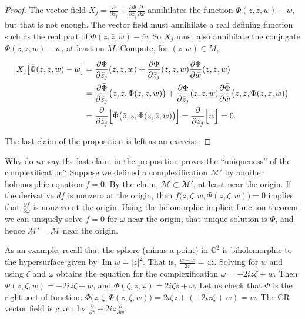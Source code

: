 \documentclass[12pt,openany]{book}
\renewcommand{\Im}{\operatorname{Im}}
\newcommand{\sabs}[1]{\lvert {#1} \rvert}
\newcommand{\C}{{\mathbb{C}}}
\newcommand{\sM}{{\mathscr{M}}}
\theoremstyle{plain}
\theoremstyle{remark}
\theoremstyle{definition}
\theoremstyle{exercise}
\theoremstyle{example}
\begin{document}
\begin{proof}
The vector field
$X_j = \frac{\partial}{\partial \bar{z}_j}
+\frac{\partial \Phi}{\partial \bar{z}_j} \frac{\partial}{\partial \omega}$
annihilates
the function $\Phi(z,\bar{z},w)-\bar{w}$, but that is not enough.
The vector field must annihilate a real defining function such as the
real part of $\Phi(z,\bar{z},w)-\bar{w}$.  So $X_j$ must also
annihilate the conjugate
$\bar{\Phi}(\bar{z},z,\bar{w})-w$, at least on $M$.  Compute, for $(z,w) \in M$,
\begin{equation*}
\begin{split}
X_j \bigl[\bar{\Phi}(\bar{z},z,\bar{w})-w\bigr]
&=
\frac{\partial \bar{\Phi}}{\partial \bar{z}_j}
{(\bar{z},z,\bar{w})}
+
\frac{\partial \Phi}{\partial \bar{z}_j}
{(z,\bar{z},w)}
\frac{\partial \bar{\Phi}}{\partial \bar{w}}
{(\bar{z},z,\bar{w})}
\\
& =
\frac{\partial \bar{\Phi}}{\partial \bar{z}_j}
{\bigl(\bar{z},z,\Phi(z,\bar{z},\bar{w})\bigr)}
+
\frac{\partial \Phi}{\partial \bar{z}_j}
{(z,\bar{z},w)}
\frac{\partial \bar{\Phi}}{\partial \bar{w}}
{\bigl(\bar{z},z,\Phi(z,\bar{z},\bar{w})\bigr)}
\\
& = 
\frac{\partial}{\partial \bar{z}_j}
\Bigl[
\bar{\Phi}\bigl(\bar{z},z,\Phi(z,\bar{z},w)\bigr)
\Bigr]
=
\frac{\partial}{\partial \bar{z}_j}
\Bigl[
w
\Bigr]
= 0 .
\end{split}
\end{equation*}

The last claim of the proposition is left as an exercise.
\end{proof}

Why do we say the last claim in the proposition
proves the ``uniqueness'' of the complexification?
Suppose we defined a complexification $\sM'$ by another holomorphic
equation $f=0$.
By the claim, $\sM \subset \sM'$, at least near the origin.
If the derivative $df$ is nonzero at the origin, then
$f\bigl(z,\zeta,w,\Phi(z,\zeta,w)\bigr) = 0$ implies that 
$\frac{\partial f}{\partial \omega}$ is nonzero at the origin.
Using the holomorphic implicit function theorem we can uniquely solve $f=0$
for $\omega$ near the origin, that unique solution is $\Phi$,
and hence $\sM' = \sM$ near the origin.

As an example, recall that the sphere (minus a point) in $\C^2$ is biholomorphic to the
hypersurface
given by $\Im w = \sabs{z}^2$.  That is, $\frac{w-\bar{w}}{2i} = z \bar{z}$.  Solving for
$\bar{w}$ and using $\zeta$ and $\omega$ obtains the equation for the
complexification $\omega = -2iz \zeta + w$.  Then
$\Phi(z,\zeta,w) = 
-2iz \zeta + w$, and
$\bar{\Phi}(\zeta,z,\omega) = 2i\zeta z + \omega$.  Let us check
that $\Phi$ is the right sort of function:
$\bar{\Phi}\bigl(z,\zeta,\Phi(z,\zeta,w)\bigr)
=
2i\zeta z + (-2i z \zeta + w) = w$.  The CR vector field is
given by
$\frac{\partial}{\partial \bar{z}}
+2i z \frac{\partial}{\partial \bar{w}}$.
\end{document}
